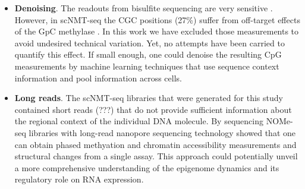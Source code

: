 \begin{itemize}
	\item \textbf{Denoising}. The readouts from bisulfite sequencing are very sensitive \cite{XX}. However, in scNMT-seq the CGC positions (27\%) suffer from off-target effects of the GpC methylase \cite{Kelly2012}. In this work we have excluded those measurements to avoid undesired technical variation. Yet, no attempts have been carried to quantify this effect. If small enough, one could denoise the resulting CpG measurements by machine learning techniques that use sequence context information and pool information across cells.

	\item \textbf{Long reads}. The scNMT-seq libraries that were generated for this study contained short reads (???) that do not provide sufficient information about the regional context of the individual DNA molecule. By sequencing NOMe-seq libraries with long-read nanopore sequencing technology \cite{Lee2018} showed that one can obtain phased methyation and chromatin accessibility measurements and structural changes from a single assay. This approach could potentially unveil a more comprehensive understanding of the epigenome dynamics and its regulatory role on RNA expression.

\end{itemize}



